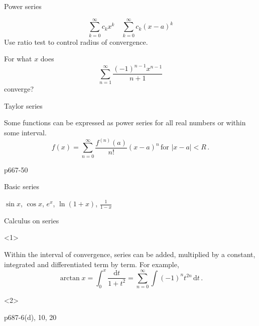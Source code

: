 \begin{frame}{Power series}


\[
\sum_{k=0}^{\infty}c_{k}x^{k}\quad\sum_{k=0}^{\infty}c_{k}\left(x-a\right)^{k}
\]
Use ratio test to control radius of convergence.



\begin{example}
For what $x$ does
\[
\sum_{n=1}^{\infty}\frac{\left(-1\right)^{n-1}x^{n-1}}{n+1}
\]
converge?
\end{example}

\end{frame}

\begin{frame}{Taylor series}


Some functions can be expressed as power series for all real numbers
or within some interval.
\[
f\left(x\right)=\sum_{n=0}^{\infty}\frac{f^{\left(n\right)}\left(a\right)}{n!}\left(x-a\right)^{n}\,\mbox{for }\left|x-a\right|<R\,.
\]

\begin{example}
p667-50
\end{example}

\end{frame}

\begin{frame}{Basic series}


$\sin x$, $\cos x$, $e^{x}$, $\ln\left(1+x\right)$, $\frac{1}{1-x}$

\end{frame}

\begin{frame}{Calculus on series}

\begin{onlyenv}<1>


Within the interval of convergence, series can be added, multiplied
by a constant, integrated and differentiated \alert{term by term}.
For example,
\[
\arctan x=\int_{0}^{x}\frac{\mathrm{d}t}{1+t^{2}}=\sum_{n=0}^{\infty}\int\left(-1\right)^{n}t^{2n}\,\mathrm{d}t\,.
\]


\end{onlyenv}



\begin{onlyenv}<2>

\begin{example}
    p687-6(d), 10, 20
\end{example}

\end{onlyenv}

\end{frame}

